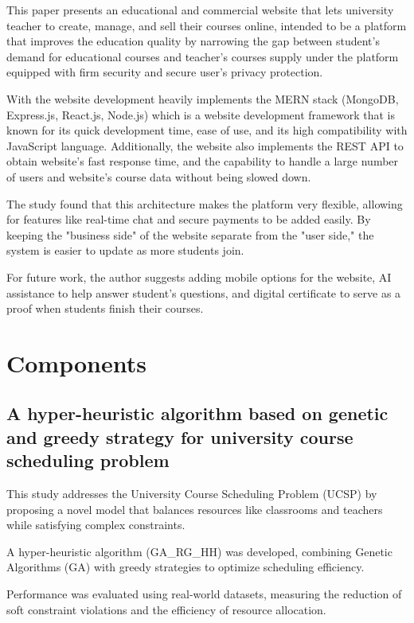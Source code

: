 This paper presents an educational and commercial website that lets university teacher to create, manage, and sell their courses online, intended to be a platform that improves the education quality by narrowing the gap between student's demand for educational courses and teacher's courses supply under the platform equipped with firm security and secure user's privacy protection.

With the website development heavily implements the MERN stack (MongoDB, Express.js, React.js, Node.js) which is a website development framework that is known for its quick development time, ease of use, and its high compatibility with JavaScript language. Additionally, the website also implements the REST API to obtain website's fast response time, and the capability to handle a large number of users and website's course data without being slowed down.

The study found that this architecture makes the platform very flexible, allowing for features like real-time chat and secure payments to be added easily. By keeping the "business side" of the website separate from the "user side," the system is easier to update as more students join.

For future work, the author suggests adding mobile options for the website, AI assistance to help answer student's questions, and digital certificate to serve as a proof when students finish their courses.


\section{Components}


\subsection{A hyper-heuristic algorithm based on genetic and greedy strategy for university course scheduling problem \cite{paper_3}}
This study addresses the University Course Scheduling Problem (UCSP) by proposing a novel model that balances resources like classrooms and teachers while satisfying complex constraints.

A hyper-heuristic algorithm (GA\_RG\_HH) was developed, combining Genetic Algorithms (GA) with greedy strategies to optimize scheduling efficiency.

Performance was evaluated using real-world datasets, measuring the reduction of soft constraint violations and the efficiency of resource allocation.

